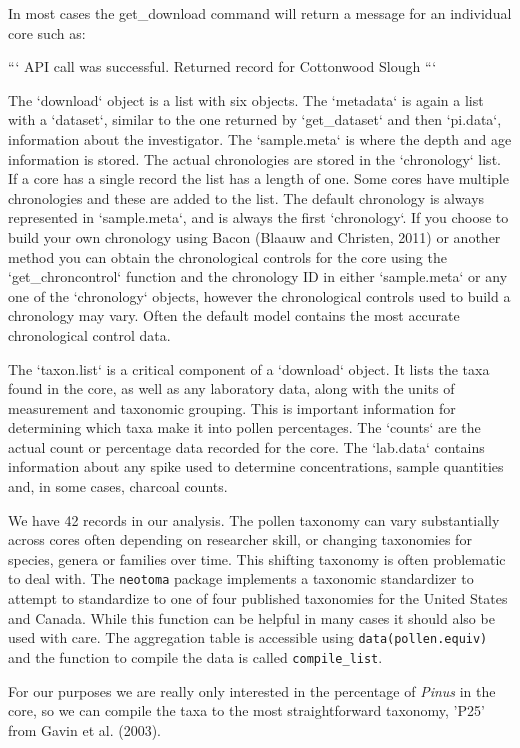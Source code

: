 \documentclass{article}
\begin{document}
{In most cases the get_download command will return a message for an individual core such as:

```
API call was successful. Returned record for Cottonwood Slough
```

The `download` object is a list with six objects.  The `metadata` is again a list with a `dataset`, similar to the one returned by `get_dataset` and then `pi.data`, information about the investigator.  The `sample.meta` is where the depth and age information is stored. The actual chronologies are stored in the `chronology` list.  If a core has a single record the list has a length of one.  Some cores have multiple chronologies and these are added to the list.  The default chronology is always represented in `sample.meta`, and is always the first `chronology`.  If you choose to build your own chronology using Bacon (Blaauw and Christen, 2011) or another method you can obtain the chronological controls for the core using the `get_chroncontrol` function and the chronology ID in either `sample.meta` or any one of the `chronology` objects, however the chronological controls used to build a chronology may vary.  Often the default model contains the most accurate chronological control data.

The `taxon.list` is a critical component of a `download` object.  It lists the taxa found in the core, as well as any laboratory data, along with the units of measurement and taxonomic grouping.  This is important information for determining which taxa make it into pollen percentages. The `counts` are the actual count or percentage data recorded for the core.  The `lab.data` contains information about any spike used to determine concentrations, sample quantities and, in some cases, charcoal counts.

We have 42 records in our analysis. The pollen taxonomy can vary substantially across cores often depending on researcher skill, or changing taxonomies for species, genera or families over time.  This shifting taxonomy is often problematic to deal with.  The \texttt{neotoma} package implements a taxonomic standardizer to attempt to standardize to one of four published taxonomies for the United States and Canada.  While this function can be helpful in many cases it should also be used with care.  The aggregation table is accessible using \texttt{data(pollen.equiv)} and the function to compile the data is called \texttt{compile_list}.

For our purposes we are really only interested in the percentage of \emph{Pinus} in the core, so we can compile the taxa to the most straightforward taxonomy, 'P25' from Gavin et al. (2003).


}
\end{document}
